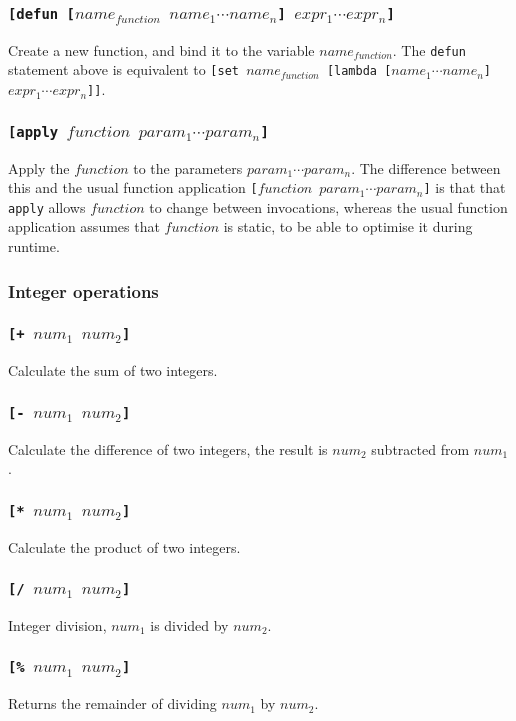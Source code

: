 \documentclass[11pt]{report}
\begin{document}
\subsubsection*{\tt{[defun [}$name_{function}$ $name_1 \cdots name_n$\tt{]} $expr_1 \cdots expr_n$\tt{]}}
Create a new function, and bind it to the variable $name_{function}$. The \verb|defun| statement above is equivalent to {\tt{[set }}$name_{function}${\tt{ [lambda [}}$name_1 \cdots name_n${\tt{]}} $expr_1 \cdots expr_n${\tt{]]}}.

\subsubsection*{\tt{[apply }$function$ $param_1 \cdots param_n$\tt{]}}
Apply the $function$ to the parameters $param_1\cdots param_n$. The difference between this and the usual function application {\tt{[}$function$ $param_1\cdots param_n$\tt{]}} is that that \verb|apply| allows $function$ to change between invocations, whereas the usual function application assumes that $function$ is static, to be able to optimise it during runtime.

\subsubsection{Integer operations}
\subsubsection*{\tt{[+ }$num_1$ $num_2$\tt{]}}
Calculate the sum of two integers.
\subsubsection*{\tt{[- }$num_1$ $num_2$\tt{]}}
Calculate the difference of two integers, the result is $num_2$ subtracted from $num_1$.
\subsubsection*{\tt{[* }$num_1$ $num_2$\tt{]}}
Calculate the product of two integers.
\subsubsection*{\tt{[/ }$num_1$ $num_2$\tt{]}}
Integer division, $num_1$ is divided by $num_2$.
\subsubsection*{\tt{[\% }$num_1$ $num_2$\tt{]}}
Returns the remainder of dividing $num_1$ by $num_2$.
\end{document}
